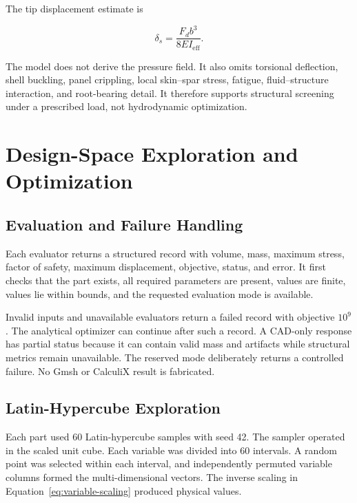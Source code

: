 The tip displacement estimate is

\begin{equation}
\delta_s=\frac{F_db^3}{8EI_{\mathrm{eff}}}.
\label{eq:stabilizer-displacement}
\end{equation}

The model does not derive the pressure field. It also omits torsional
deflection, shell buckling, panel crippling, local skin--spar stress, fatigue,
fluid--structure interaction, and root-bearing detail. It therefore supports
structural screening under a prescribed load, not hydrodynamic optimization.

\section{Design-Space Exploration and Optimization}
\label{sec:search-method}

\subsection{Evaluation and Failure Handling}
\label{sec:evaluation-contract}

Each evaluator returns a structured record with volume, mass, maximum stress,
factor of safety, maximum displacement, objective, status, and error. It first
checks that the part exists, all required parameters are present, values are
finite, values lie within bounds, and the requested evaluation mode is
available.

Invalid inputs and unavailable evaluators return a failed record with
objective $10^9$. The analytical optimizer can continue after such a record.
A CAD-only response has partial status because it can contain valid mass and
artifacts while structural metrics remain unavailable. The reserved
 mode deliberately returns a controlled failure. No Gmsh or
CalculiX result is fabricated.

\subsection{Latin-Hypercube Exploration}
\label{sec:sampling-method}

Each part used 60 Latin-hypercube samples with seed 42. The sampler operated in
the scaled unit cube. Each variable was divided into 60 intervals. A random
point was selected within each interval, and independently permuted variable
columns formed the multi-dimensional vectors. The inverse scaling in
Equation~\ref{eq:variable-scaling} produced physical values.

